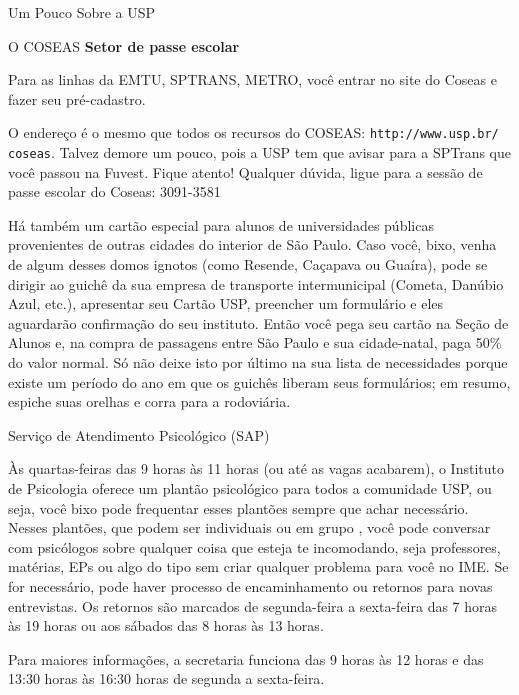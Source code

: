 \begin{secao}{Um Pouco Sobre a USP}
\begin{subsecao}{O COSEAS}
{\bf Setor de passe escolar}

Para as linhas da EMTU, SPTRANS, METRO, você entrar no site do Coseas e fazer
seu pré-cadastro. 

O endereço é o mesmo que todos os recursos do COSEAS: {\tt http://www.usp.br/
coseas}. Talvez demore um pouco, pois a USP tem 
que avisar para a SPTrans que você passou na Fuvest. Fique atento! Qualquer 
dúvida, ligue para a sessão de passe escolar do Coseas: 3091-3581 

Há também um cartão especial para alunos de universidades públicas provenientes
de outras cidades do interior de São Paulo. Caso você, bixo, venha de algum desses domos ignotos
(como Resende, Caçapava ou Guaíra), pode se dirigir ao guichê da sua empresa de
transporte intermunicipal (Cometa, Danúbio Azul, etc.), apresentar seu Cartão USP,
preencher um formulário e eles aguardarão confirmação do seu instituto. Então
você pega seu cartão na Seção de Alunos e, na compra de passagens entre São Paulo
e sua cidade-natal, paga 50\% do valor normal. Só não deixe isto por último na
sua lista de necessidades porque existe um período do ano em que os guichês
liberam seus formulários; em resumo, espiche suas orelhas e corra para a rodoviária.

\end{subsecao}

\begin{subsecao}{Serviço de Atendimento Psicológico (SAP)}

Às quartas-feiras das 9 horas às 11 horas (ou até as vagas acabarem),
o Instituto de Psicologia oferece um plantão psicológico para todos a
comunidade USP, ou seja, você bixo pode frequentar esses plantões sempre
que achar necessário. Nesses plantões, que podem ser individuais ou em grupo
, você pode conversar com psicólogos sobre qualquer coisa que esteja te
incomodando, seja professores, matérias, EPs ou algo do tipo sem criar qualquer
problema para você no IME. Se for necessário, pode haver processo de
encaminhamento ou retornos para novas entrevistas. Os retornos são marcados de
segunda-feira a sexta-feira das 7 horas às 19 horas ou aos sábados das
8 horas às 13 horas.

Para maiores informações, a secretaria funciona das 9 horas às 12 horas e das
13:30 horas às 16:30 horas de segunda a sexta-feira. 
 
\end{subsecao}

\pagebreak




\end{secao}
